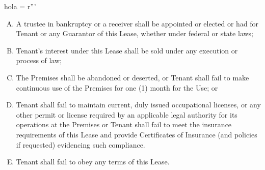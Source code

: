 hola = r'''\documentclass{article}
\begin{document}
\begin{enumerate}[(A)]
    \item	A trustee in bankruptcy or a receiver shall be appointed or elected or had for Tenant or any Guarantor of this Lease, whether under federal or state laws;

    \item	Tenant's interest under this Lease shall be sold under any execution or process of law;

    \item	The Premises shall be abandoned or deserted, or Tenant shall fail to make continuous use of the Premises for one (1) month for the Use; or

    \item	Tenant shall fail to maintain current, duly issued occupational licenses, or any other permit or license required by an applicable legal authority for its operations at the Premises or Tenant shall fail to meet the insurance requirements of this Lease and provide Certificates of Insurance (and policies if requested) evidencing such compliance.

    \item	Tenant shall fail to obey any terms of this Lease.
    
    \end{enumerate}
\end{document}
